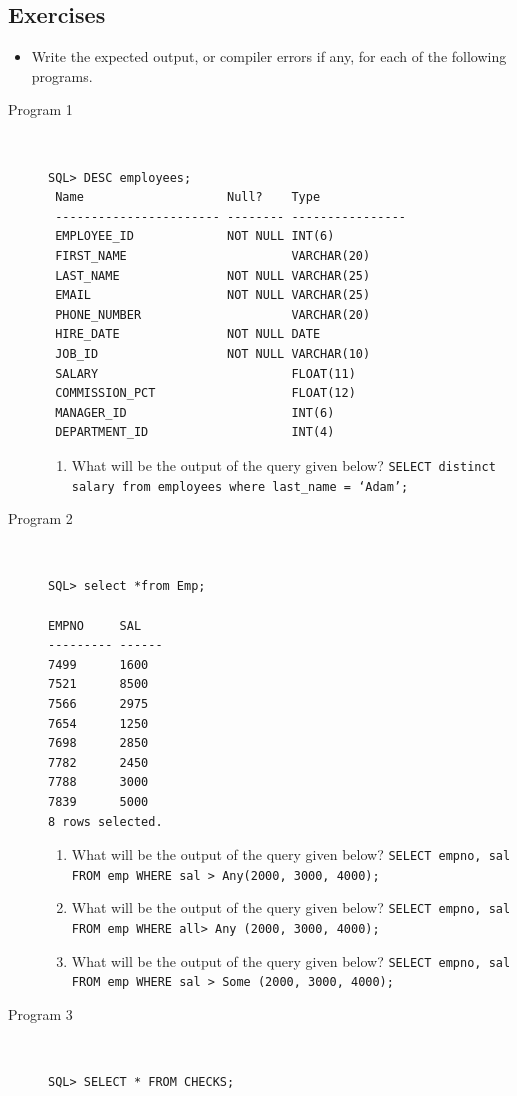 \documentclass[11pt,a4paper]{article}
\def\AnswerBox{\fbox{\begin{minipage}{4in}\hfill\vspace{0.5in}\end{minipage}}}
\begin{document}
\subsection*{Exercises}
\begin{itemize}
\item Write the expected output, or compiler errors if any, for each of the following programs.
\end{itemize}
\begin{description}
\item[Program 1]\
\begin{verbatim}
SQL> DESC employees;
 Name                    Null?    Type
 ----------------------- -------- ----------------
 EMPLOYEE_ID             NOT NULL INT(6)
 FIRST_NAME                       VARCHAR(20)
 LAST_NAME               NOT NULL VARCHAR(25)
 EMAIL                   NOT NULL VARCHAR(25)
 PHONE_NUMBER                     VARCHAR(20)
 HIRE_DATE               NOT NULL DATE
 JOB_ID                  NOT NULL VARCHAR(10)
 SALARY                           FLOAT(11)
 COMMISSION_PCT                   FLOAT(12)
 MANAGER_ID                       INT(6)
 DEPARTMENT_ID                    INT(4)
\end{verbatim}


\begin{enumerate}[label=\bfseries Q\arabic*:]\itemsep10pt
\item What will be the output of the query given below?\newline
\texttt{SELECT distinct salary from employees where last\_name = `Adam';}
\end{enumerate}

\item[Program 2]\
\begin{verbatim}
SQL> select *from Emp;

EMPNO     SAL
--------- ------
7499      1600
7521      8500
7566      2975
7654      1250
7698      2850
7782      2450
7788      3000
7839      5000
8 rows selected.

\end{verbatim}


\begin{enumerate}[label=\bfseries Q\arabic*:]\itemsep10pt
\item What will be the output of the query given below?\newline
\texttt{SELECT empno, sal FROM emp WHERE sal > Any(2000, 3000, 4000);}
\item What will be the output of the query given below?\newline
\texttt{SELECT empno, sal FROM   emp WHERE  all> Any (2000, 3000, 4000);}
\item What will be the output of the query given below?\newline
\texttt{SELECT empno, sal  FROM   emp WHERE  sal > Some (2000, 3000, 4000);}
\end{enumerate}
\item [Program 3]\ 
\begin{verbatim}
SQL> SELECT * FROM CHECKS;


\end{verbatim}
\end{description}
\end{document}
